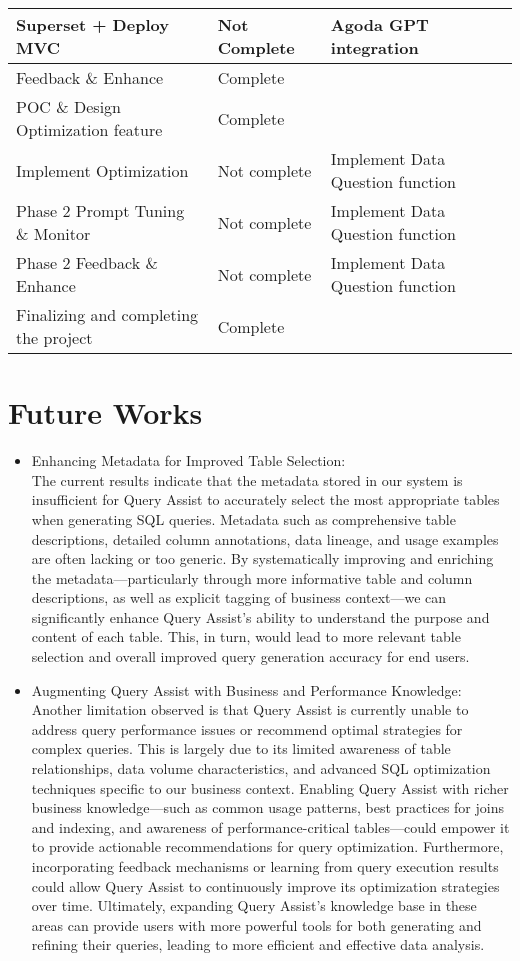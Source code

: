 \begin{table}[H]
\begin{tabular}{|p{6cm}|p{3cm}|p{5cm}|}
        Superset + Deploy MVC & Not Complete & Agoda GPT integration\\
        \hline
        Feedback \& Enhance & Complete &  \\
        \hline
        POC \& Design Optimization feature & Complete & \\
        \hline
        Implement Optimization & Not complete & Implement Data Question function\\
        \hline
        Phase 2 Prompt Tuning \& Monitor & Not complete & Implement Data Question function\\
        \hline
        Phase 2 Feedback \& Enhance & Not complete & Implement Data Question function\\
        \hline
        Finalizing and completing the project & Complete & \\
        \hline
    \end{tabular}
\end{table}
\pagebreak
\section{Future Works}
\begin{itemize}
  \item Enhancing Metadata for Improved Table Selection:\\The current results indicate that the metadata stored in our system is insufficient for Query Assist to accurately select the most appropriate tables when generating SQL queries. Metadata such as comprehensive table descriptions, detailed column annotations, data lineage, and usage examples are often lacking or too generic. By systematically improving and enriching the metadata—particularly through more informative table and column descriptions, as well as explicit tagging of business context—we can significantly enhance Query Assist's ability to understand the purpose and content of each table. This, in turn, would lead to more relevant table selection and overall improved query generation accuracy for end users.
  \item Augmenting Query Assist with Business and Performance Knowledge:\\Another limitation observed is that Query Assist is currently unable to address query performance issues or recommend optimal strategies for complex queries. This is largely due to its limited awareness of table relationships, data volume characteristics, and advanced SQL optimization techniques specific to our business context. Enabling Query Assist with richer business knowledge—such as common usage patterns, best practices for joins and indexing, and awareness of performance-critical tables—could empower it to provide actionable recommendations for query optimization. Furthermore, incorporating feedback mechanisms or learning from query execution results could allow Query Assist to continuously improve its optimization strategies over time. Ultimately, expanding Query Assist’s knowledge base in these areas can provide users with more powerful tools for both generating and refining their queries, leading to more efficient and effective data analysis.
\end{itemize}
\pagebreak
